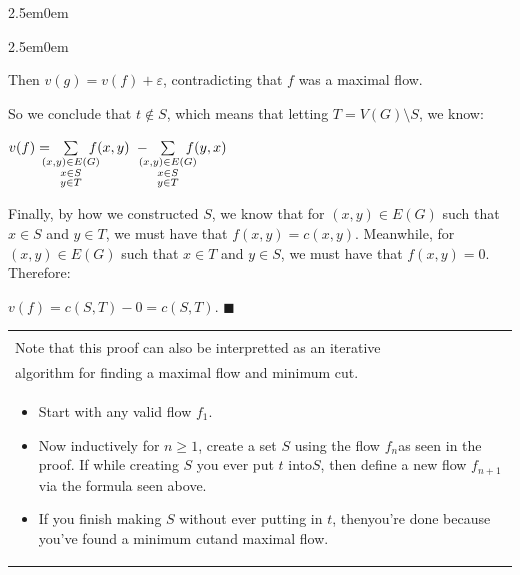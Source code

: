 \documentclass{book}
\newcommand{\teachComment}{
   \color{Orange}%
   \fontsize{12}{14}\selectfont%
}
\newenvironment{myIndent}{%
   \begin{adjustwidth}{2.5em}{0em}%
}{%
   \end{adjustwidth}%
}
\newenvironment{myClosureOne}[2][.]{%
   \color{#1}%
   \begin{tabular}{|p{#2in}|} \hline \\%
}{%
   \\ \hline \end{tabular}%
}
\newcommand{\retTwo}{\hfill\bigbreak}
\begin{document}
{\begin{myIndent}
{\begin{myIndent}
      Then $v(g) = v(f) + \varepsilon$, contradicting that $f$ was a maximal flow.\retTwo

      So we conclude that $t \notin S$, which means that letting $T = V(G) \setminus S$, we know:
   
      {\center $ v(f) = \hspace{-1em}\sum\limits_{
      \begin{smallmatrix}
         (x, y) \in E(G) \\
         x \in S \\
         y \in T
      \end{smallmatrix}}\hspace{-1.1em}f(x, y)\hspace{0.3em} - \hspace{-1em}\sum\limits_{
      \begin{smallmatrix}
         (x, y) \in E(G) \\
         x \in S \\
         y \in T
      \end{smallmatrix}}\hspace{-1.1em}f(y, x)$ \retTwo\par}

      Finally, by how we constructed $S$, we know that for $(x, y) \in E(G)$ such that $x \in S$ and $y \in T$, we must have that $f(x, y) = c(x, y)$. Meanwhile, for\\ $(x, y) \in E(G)$ such that $x \in T$ and $y \in S$, we must have that $f(x, y) = 0$.\\Therefore:

      {\centering $ v(f) = c(S, T) - 0 = c(S, T)$. $\blacksquare$ \retTwo\par}

      
      
      {\begin{center} \teachComment
         \begin{myClosureOne}{4.5}
            Note that this proof can also be interpretted as an iterative\\ algorithm for finding a maximal flow and minimum cut.\\
            \begin{itemize}
               \item Start with any valid flow $f_1$. 
               \item Now inductively for $n \geq 1$, create a set $S$ using the flow $f_n$\newline as seen in the proof. If while creating $S$ you ever put $t$ into\newline $S$, then define a new flow $f_{n+1}$ via the formula seen above. 
               \item If you finish making $S$ without ever putting in $t$, then\newline you're done because you've found a minimum cut\newline and maximal flow.\retTwo
            \end{itemize}


\end{myClosureOne}
\end{center}}
\end{myIndent}}
\end{myIndent}}
\end{document}
